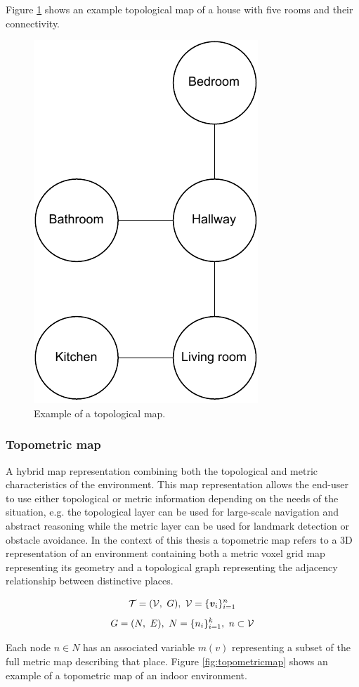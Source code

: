 Figure \ref{fig:topomap} shows an example topological map of a house with five rooms and their connectivity.

\begin{figure}[h]
    \centering
    \includegraphics*[width=.3\textwidth]{./fig/topological_map.pdf}
    \caption{Example of a topological map.}
    \label{fig:topomap}
\end{figure}

\pagebreak

\subsubsection{Topometric map}
A hybrid map representation combining both the topological and metric characteristics of the environment. This map representation allows the end-user to use either topological or metric information depending on the needs of the situation, e.g. the topological layer can be used for large-scale navigation and abstract reasoning while the metric layer can be used for landmark detection or obstacle avoidance. In the context of this thesis a topometric map refers to a 3D representation of an environment containing both a metric voxel grid map representing its geometry and a topological graph representing the adjacency relationship between distinctive places. 

\begin{equation}
    \label{eq:topometricmap}
    \topometricmap = (\voxelgrid,\ G),\ \voxelgrid=\{\voxel_{i}\}_{i=1}^{n}
\end{equation}
\begin{equation}
    \label{eq:place_subset}
    G=(N,\ E),\ N=\{n_i\}_{i=1}^k,\ n \subset \mathcal{V}
\end{equation}

Each node \(n \in N\) has an associated variable \(m(v)\) representing a subset of the full metric map describing that place. Figure \ref{fig:topometricmap} shows an example of a topometric map of an indoor environment.


